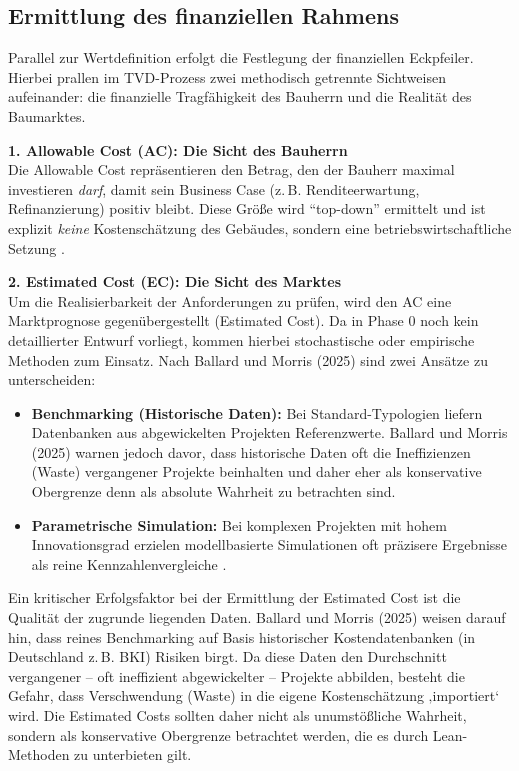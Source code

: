 \subsection{Ermittlung des finanziellen Rahmens}
\label{sec:4.2.2}
Parallel zur Wertdefinition erfolgt die Festlegung der finanziellen Eckpfeiler. Hierbei prallen im \acs{TVD}-Prozess zwei methodisch getrennte Sichtweisen aufeinander: die finanzielle Tragfähigkeit des Bauherrn und die Realität des Baumarktes.

\textbf{1. Allowable Cost (AC): Die Sicht des Bauherrn}\\
Die Allowable Cost repräsentieren den Betrag, den der Bauherr maximal investieren \textit{darf}, damit sein Business Case (z.\,B. Renditeerwartung, Refinanzierung) positiv bleibt. Diese Größe wird \enquote{top-down} ermittelt und ist explizit \textit{keine} Kostenschätzung des Gebäudes, sondern eine betriebswirtschaftliche Setzung \autocite[Vgl.][S.~5]{ballard_target_2012}.

\textbf{2. Estimated Cost (EC): Die Sicht des Marktes}\\
Um die Realisierbarkeit der Anforderungen zu prüfen, wird den AC eine Marktprognose gegenübergestellt (Estimated Cost). Da in Phase 0 noch kein detaillierter Entwurf vorliegt, kommen hierbei stochastische oder empirische Methoden zum Einsatz. Nach Ballard und Morris (2025) sind zwei Ansätze zu unterscheiden:
\begin{itemize}
    \item \textbf{Benchmarking (Historische Daten):} Bei Standard-Typologien liefern Datenbanken aus abgewickelten Projekten Referenzwerte. Ballard und Morris (2025) warnen jedoch davor, dass historische Daten oft die Ineffizienzen (Waste) vergangener Projekte beinhalten und daher eher als konservative Obergrenze denn als absolute Wahrheit zu betrachten sind.
    \item \textbf{Parametrische Simulation:} Bei komplexen Projekten mit hohem Innovationsgrad erzielen modellbasierte Simulationen oft präzisere Ergebnisse als reine Kennzahlenvergleiche \autocite[Vgl.][S.~71]{ballard_target_2025}.
\end{itemize}

Ein kritischer Erfolgsfaktor bei der Ermittlung der Estimated Cost ist die Qualität der zugrunde liegenden Daten. Ballard und Morris (2025) weisen darauf hin, dass reines Benchmarking auf Basis historischer Kostendatenbanken (in Deutschland z.\,B. BKI) Risiken birgt. Da diese Daten den Durchschnitt vergangener – oft ineffizient abgewickelter – Projekte abbilden, besteht die Gefahr, dass Verschwendung (Waste) in die eigene Kostenschätzung ‚importiert‘ wird. Die Estimated Costs sollten daher nicht als unumstößliche Wahrheit, sondern als konservative Obergrenze betrachtet werden, die es durch Lean-Methoden zu unterbieten gilt. \autocite[Vgl.][S.~70 ff]{ballard_target_2025}


